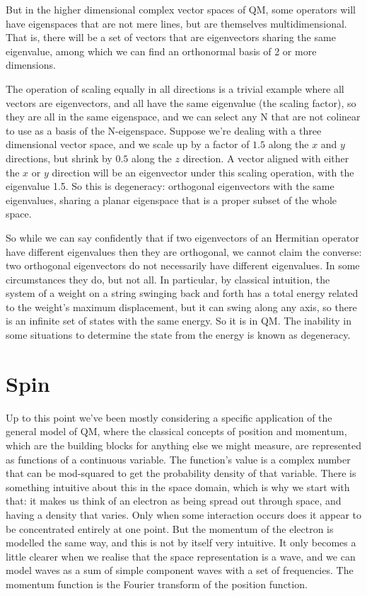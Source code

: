 But in the higher dimensional complex vector spaces of QM, some operators will have eigenspaces that are not mere lines, but are themselves multidimensional. That is, there will be a set of vectors that are eigenvectors sharing the same eigenvalue, among which we can find an orthonormal basis of 2 or more dimensions.

The operation of scaling equally in all directions is a trivial example where all vectors are eigenvectors, and all have the same eigenvalue (the scaling factor), so they are all in the same eigenspace, and we can select any N that are not colinear to use as a basis of the N-eigenspace. Suppose we're dealing with a three dimensional vector space, and we scale up by a factor of $1.5$ along the $x$ and $y$ directions, but shrink by $0.5$ along the $z$ direction. A vector aligned with either the $x$ or $y$ direction will be an eigenvector under this scaling operation, with the eigenvalue 1.5. So this is degeneracy: orthogonal eigenvectors with the same eigenvalues, sharing a planar eigenspace that is a proper subset of the whole space.

So while we can say confidently that if two eigenvectors of an Hermitian operator have different eigenvalues then they are orthogonal, we cannot claim the converse: two orthogonal eigenvectors do not necessarily have different eigenvalues. In some circumstances they do, but not all. In particular, by classical intuition, the system of a weight on a string swinging back and forth has a total energy related to the weight's maximum displacement, but it can swing along any axis, so there is an infinite set of states with the same energy. So it is in QM. The inability in some situations to determine the state from the energy is known as degeneracy.

\section{Spin}

Up to this point we've been mostly considering a specific application of the general model of QM, where the classical concepts of position and momentum, which are the building blocks for anything else we might measure, are represented as functions of a continuous variable. The function's value is a complex number that can be mod-squared to get the probability density of that variable. There is something intuitive about this in the space domain, which is why we start with that: it makes us think of an electron as being spread out through space, and having a density that varies. Only when some interaction occurs does it appear to be concentrated entirely at one point. But the momentum of the electron is modelled the same way, and this is not by itself very intuitive. It only becomes a little clearer when we realise that the space representation is a wave, and we can model waves as a sum of simple component waves with a set of frequencies. The momentum function is the Fourier transform of the position function.

